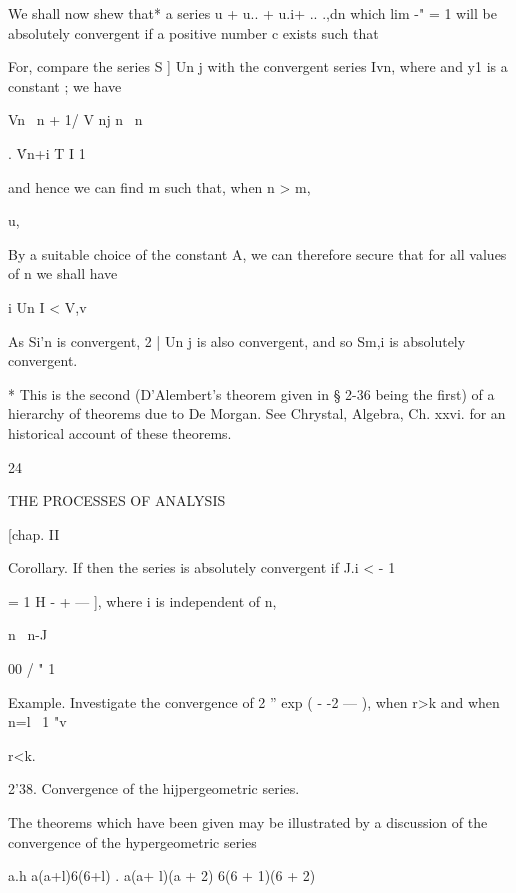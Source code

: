 We shall now shew that* a series u + u.. + u.i+ .. .,dn which lim -" =
1 will be absolutely convergent if a positive number c exists such
that

For, compare the series S ] Un j with the convergent series Ivn, where
and y1 is a constant ; we have



Vn \ n + 1/ V nj n \ n

. \'Vn+i T I 1

and hence we can find m such that, when n > m,



u,






By a suitable choice of the constant A, we can therefore secure that
for all values of n we shall have

i Un I < V,v

As Si'n is convergent, 2 | Un j is also convergent, and so Sm,i is
absolutely convergent.

* This is the second (D'Alembert's theorem given in § 2-36 being the
first) of a hierarchy of theorems due to De Morgan. See Chrystal,
Algebra, Ch. xxvi. for an historical account of these theorems.



24



THE PROCESSES OF ANALYSIS



[chap. II






Corollary. If then the series is absolutely convergent if J.i < - 1



= 1 H - + — ], where i is independent of n,

n \ n-J



00 / " 1 \

Example. Investigate the convergence of 2 '' exp ( - -2 — ), when r>k
and when n=l \ 1 "v



r<k.

2'38. Convergence of the hijpergeometric series.

The theorems which have been given may be illustrated by a discussion
of the convergence of the hypergeometric series

  a.h a(a+l)6(6+l) . a(a+ l)(a + 2) 6(6 + 1)(6 + 2)

